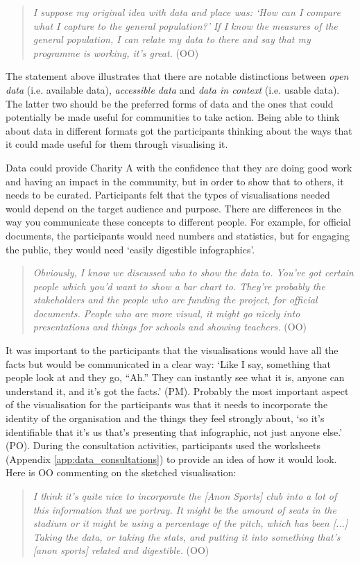\begin{quote}
    \textit{I suppose my original idea with data and place was: `How can I compare what I capture to the general population?' If I know the measures of the general population, I can relate my data to there and say that my programme is working, it's great.} (OO)
\end{quote}
The statement above illustrates that there are notable distinctions between \textit{open data} (i.e. available data), \textit{accessible data} and \textit{data in context} (i.e. usable data). The latter two should be the preferred forms of data and the ones that could potentially be made useful for communities to take action. Being able to think about data in different formats got the participants thinking about the ways that it could made useful for them through visualising it.

Data could provide Charity A with the confidence that they are doing good work and having an impact in the community, but in order to show that to others, it needs to be curated. Participants felt that the types of visualisations needed would depend on the target audience and purpose. There are differences in the way you communicate these concepts to different people. For example, for official documents, the participants would need numbers and statistics, but for engaging the public, they would need `easily digestible infographics'.
\begin{quote}
    \textit{Obviously, I know we discussed who to show the data to. You've got certain people which you'd want to show a bar chart to. They're probably the stakeholders and the people who are funding the project, for official documents. People who are more visual, it might go nicely into presentations and things for schools and showing teachers.} (OO)
\end{quote}
It was important to the participants that the visualisations would have all the facts but would be communicated in a clear way: `Like I say, something that people look at and they go, ``Ah.'' They can instantly see what it is, anyone can understand it, and it's got the facts.' (PM).
Probably the most important aspect of the visualisation for the participants was that it needs to incorporate the identity of the organisation and the things they feel strongly about, `so it's identifiable that it's us that's presenting that infographic, not just anyone else.' (PO). During the consultation activities, participants used the worksheets (Appendix \ref{app:data_consultations}) to provide an idea of how it would look. Here is OO commenting on the sketched visualisation:
\begin{quote}
    \textit{I think it's quite nice to incorporate the [Anon Sports] club into a lot of this information that we portray. It might be the amount of seats in the stadium or it might be using a percentage of the pitch, which has been [...] Taking the data, or taking the stats, and putting it into something that's [anon sports] related and digestible.} (OO) 
\end{quote}

